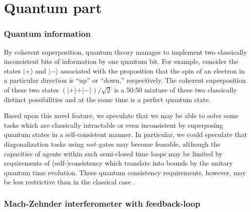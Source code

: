 \section*{Quantum part}
\subsubsection*{Quantum information}

By coherent superposition,
quantum theory manages to implement two classically inconsistent
bits of information by one quantum bit.
For example, consider the states $\vert +\rangle$ and $\vert -\rangle$
associated with the proposition that the spin of an electron
in a particular direction is ``up'' or ``down,'' respectively.
The coherent superposition  of these two states
$(\vert +\rangle + \vert -\rangle )/\sqrt{2}$
is a 50:50 mixture of these two classically distinct possibilities and at
the same time is a perfect quantum state.

Based upon this novel feature, we speculate that we may be able to solve
some tasks which are classically intractable or even inconsistent
by superposing quantum states in a self-consistent manner.
In particular, we could speculate that diagonalization tasks using
{\em not}--gates may become feasable,
although the capacities of agents within such semi-closed time loops may be limited
by requirements of (self-)consistency which translate into bounds by the
unitary quantum time evolution.
These quantum consistency requirements, however, may be less restrictive than in the classical
case \cite{maryland,svo-1995-paradox}.


\subsubsection*{Mach-Zehnder interferometer with feedback-loop}

